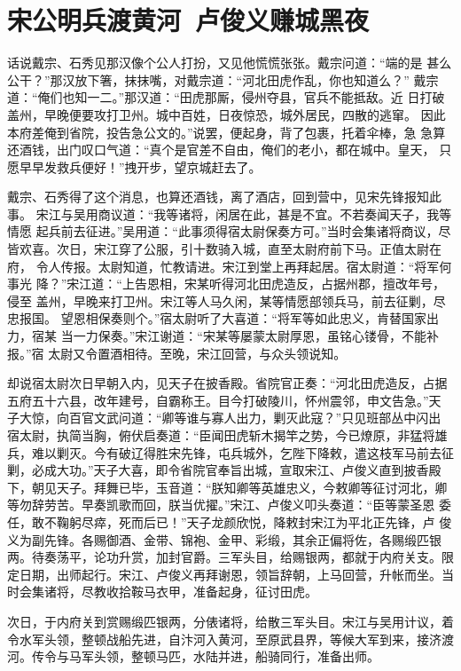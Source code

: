 \chapter{宋公明兵渡黄河~卢俊义赚城黑夜}

话说戴宗、石秀见那汉像个公人打扮，又见他慌慌张张。戴宗问道：“端的是
甚么公干？”那汉放下箸，抹抹嘴，对戴宗道：“河北田虎作乱，你也知道么？”
戴宗道：“俺们也知一二。”那汉道：“田虎那厮，侵州夺县，官兵不能抵敌。近
日打破盖州，早晚便要攻打卫州。城中百姓，日夜惊恐，城外居民，四散的逃窜。
因此本府差俺到省院，投告急公文的。”说罢，便起身，背了包裹，托着伞棒，急
急算还酒钱，出门叹口气道：“真个是官差不自由，俺们的老小，都在城中。皇天，
只愿早早发救兵便好！”拽开步，望京城赶去了。

戴宗、石秀得了这个消息，也算还酒钱，离了酒店，回到营中，见宋先锋报知此事。
宋江与吴用商议道：“我等诸将，闲居在此，甚是不宜。不若奏闻天子，我等情愿
起兵前去征进。”吴用道：“此事须得宿太尉保奏方可。”当时会集诸将商议，尽
皆欢喜。次日，宋江穿了公服，引十数骑入城，直至太尉府前下马。正值太尉在府，
令人传报。太尉知道，忙教请进。宋江到堂上再拜起居。宿太尉道：“将军何事光
降？”宋江道：“上告恩相，宋某听得河北田虎造反，占据州郡，擅改年号，侵至
盖州，早晚来打卫州。宋江等人马久闲，某等情愿部领兵马，前去征剿，尽忠报国。
望恩相保奏则个。”宿太尉听了大喜道：“将军等如此忠义，肯替国家出力，宿某
当一力保奏。”宋江谢道：“宋某等屡蒙太尉厚恩，虽铭心镂骨，不能补报。”宿
太尉又令置酒相待。至晚，宋江回营，与众头领说知。

却说宿太尉次日早朝入内，见天子在披香殿。省院官正奏：“河北田虎造反，占据
五府五十六县，改年建号，自霸称王。目今打破陵川，怀州震邻，申文告急。”天
子大惊，向百官文武问道：“卿等谁与寡人出力，剿灭此寇？”只见班部丛中闪出
宿太尉，执简当胸，俯伏启奏道：“臣闻田虎斩木揭竿之势，今已燎原，非猛将雄
兵，难以剿灭。今有破辽得胜宋先锋，屯兵城外，乞陛下降敕，遣这枝军马前去征
剿，必成大功。”天子大喜，即令省院官奉旨出城，宣取宋江、卢俊义直到披香殿
下，朝见天子。拜舞已毕，玉音道：“朕知卿等英雄忠义，今敕卿等征讨河北，卿
等勿辞劳苦。早奏凯歌而回，朕当优擢。”宋江、卢俊义叩头奏道：“臣等蒙圣恩
委任，敢不鞠躬尽瘁，死而后已！”天子龙颜欣悦，降敕封宋江为平北正先锋，卢
俊义为副先锋。各赐御酒、金带、锦袍、金甲、彩缎，其余正偏将佐，各赐缎匹银
两。待奏荡平，论功升赏，加封官爵。三军头目，给赐银两，都就于内府关支。限
定日期，出师起行。宋江、卢俊义再拜谢恩，领旨辞朝，上马回营，升帐而坐。当
时会集诸将，尽教收拾鞍马衣甲，准备起身，征讨田虎。

次日，于内府关到赏赐缎匹银两，分俵诸将，给散三军头目。宋江与吴用计议，着
令水军头领，整顿战船先进，自汴河入黄河，至原武县界，等候大军到来，接济渡
河。传令与马军头领，整顿马匹，水陆并进，船骑同行，准备出师。

